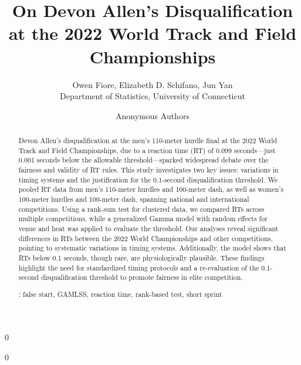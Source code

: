 \documentclass[12pt, letterpaper]{article}
\newcommand{\blind}{0}
\begin{document}
\title{\bf On Devon Allen's Disqualification at the 2022 World Track and Field Championships}

\blind
{
  \author{Owen Fiore, %
  Elizabeth D. Schifano, %
  Jun Yan\\[1ex]
  Department of Statistics, University of Connecticut\\
}
} \fi

\blind
{
  \bigskip
  \bigskip
  \bigskip
  \author{Anonymous Authors}
  \bigskip
} \fi

\maketitle

\doublespace


\begin{abstract}
Devon Allen’s disqualification at the men's 110-meter hurdle final at
the 2022 World Track and Field Championships, 
due to a reaction time (RT) of 0.099 seconds---just 0.001 seconds below
the allowable threshold---sparked widespread debate over 
the fairness and validity of RT rules. This study investigates two key
issues: variations in timing systems and the justification for the
0.1-second disqualification threshold. We
pooled RT data from men’s 110-meter hurdles and 100-meter dash, as
well as women’s 100-meter hurdles and 100-meter dash, spanning
national and international competitions. Using a rank-sum test for
clustered data, we compared RTs across multiple competitions,
while a generalized Gamma model with random effects for venue and heat
was applied to evaluate the threshold. Our analyses reveal significant
differences in RTs between the 2022 World Championships and other
competitions, pointing to systematic variations in timing
systems. Additionally, the model shows that RTs below 0.1 seconds,
though rare, are physiologically plausible. These findings highlight
the need for standardized timing protocols and a re-evaluation of the
0.1-second disqualification threshold to promote fairness in
elite competition.


\bigskip{}:
false start, GAMLSS, reaction time, rank-based test, short sprint
\end{abstract}
\end{document}

